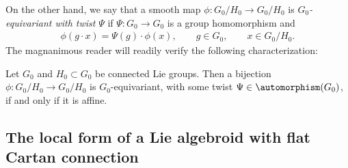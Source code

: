On the other hand, we say that a smooth map $\phi \colon G_0/H_0
\rightarrow G_0/H_0$ is {\em $G_0$-equivariant with twist} $\Psi$ if
$\Psi \colon G_0 \rightarrow G_0$ is a group homomorphism and
  \begin{gather*}
    \phi(g \cdot  x)=\Psi(g) \cdot \phi(x), \qquad g \in G_0,\qquad x \in G_0/H_0.
  \end{gather*}
  The magnanimous reader will readily verify the following
  characterization:
  \begin{PropositionBlaom}\label{Proposition2.3}
  Let $G_0$ and $H_0 \subset G_0$ be connected Lie groups. Then a
  bijection $\phi \colon G_0/H_0 \rightarrow G_0/H_0$ is
  $G_0$-equivariant, with some twist $\Psi \in \automorphism(G_0)$, if
  and only if it is affine.
\end{PropositionBlaom}



\subsection{The local form of a Lie algebroid with f\/lat Cartan
  connection}\label{localform}

